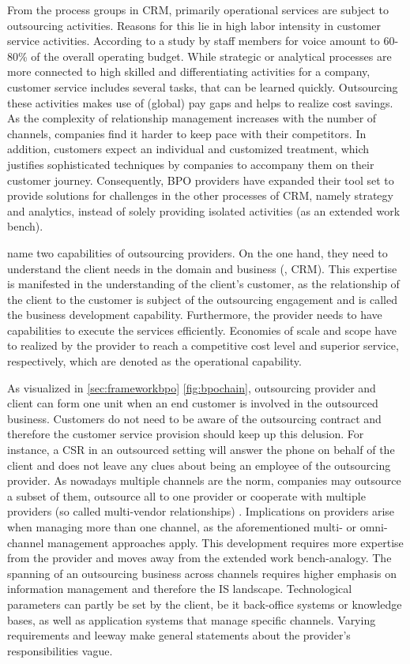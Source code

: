 		From the process groups in \acrshort{CRM}, primarily operational services are subject to outsourcing activities. Reasons for this lie in high labor intensity in customer service activities. According to a study by \cite{Aksin_2009} staff members for voice amount to 60-80\% of the overall operating budget. While strategic or analytical processes are more connected to high skilled and differentiating activities for a company, customer service includes several tasks, that can be learned quickly. Outsourcing these activities makes use of (global) pay gaps and helps to realize cost savings. As the complexity of relationship management increases with the number of channels, companies find it harder to keep pace with their competitors. In addition, customers expect an individual and customized treatment, which justifies sophisticated techniques by companies to accompany them on their customer journey. Consequently, BPO providers have expanded their tool set to provide solutions for challenges in the other processes of CRM, namely strategy and analytics, instead of solely providing isolated activities (as an extended work bench).
		
		\cite{Ramachandran2004} name two capabilities of outsourcing providers. On the one hand, they need to understand the client needs in the domain and business (\eg, CRM). This expertise is manifested in the understanding of the client's customer, as the relationship of the client to the customer is subject of the outsourcing engagement and is called the business development capability. Furthermore, the provider needs to have capabilities to execute the services efficiently. Economies of scale and scope have to realized by the provider to reach a competitive cost level and superior service, respectively, which are denoted as the operational capability.
		
		As visualized in  \ref{sec:frameworkbpo} \Fig \ref{fig:bpochain}, outsourcing provider and client can form one unit when an end customer is involved in the outsourced business. Customers do not need to be aware of the outsourcing contract and therefore the customer service provision should keep up this delusion. For instance, a \acrshort{CSR} in an outsourced setting will answer the phone on behalf of the client and does not leave any clues about being an employee of the outsourcing provider. As nowadays multiple channels are the norm, companies may outsource a subset of them, outsource all to one provider or cooperate with multiple providers (so called multi-vendor relationships) . Implications on providers arise when managing more than one channel, as the aforementioned multi- or omni-channel management approaches apply. This development requires more expertise from the provider and moves away from the extended work bench-analogy. The spanning of an outsourcing business across channels requires higher emphasis on information management and therefore the \acrshort{IS} landscape. Technological parameters can partly be set by the client, be it back-office systems or knowledge bases, as well as application systems that manage specific channels. Varying requirements and leeway make general statements about the provider's responsibilities vague. 
		
